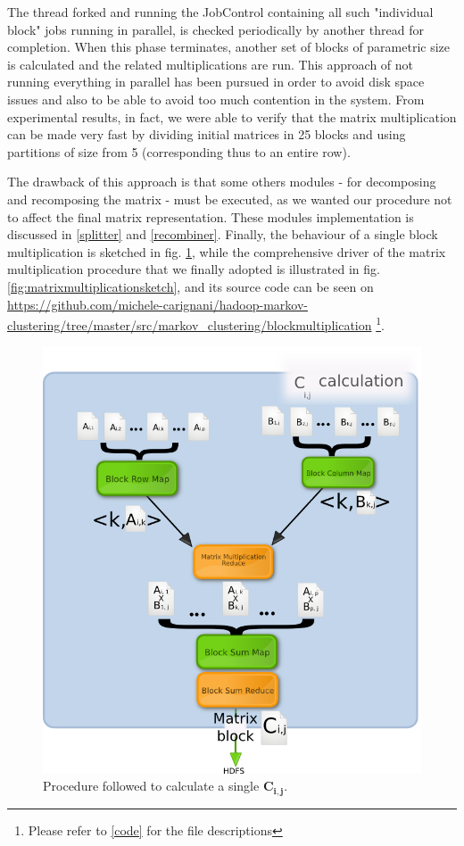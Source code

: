The thread forked and running the JobControl containing all such "individual block" jobs running in parallel, is checked periodically by another thread for completion. When this phase terminates, another set of blocks of parametric size
is calculated and the related multiplications are run.
This approach of not running everything in parallel has been pursued in order to avoid disk space issues and also to be 
able to avoid too much contention in the system.
From experimental results, in fact, we were able to verify that the matrix multiplication can be made very fast by dividing
initial matrices in 25 blocks and using partitions of size from 5 (corresponding thus to an entire row).

The drawback of this approach is that some others modules - for decomposing and recomposing the matrix - must be executed, as we wanted our procedure not to affect the final matrix representation.
These modules implementation is discussed in \ref{splitter} and \ref{recombiner}.
Finally, the behaviour of a single block multiplication is sketched in fig. \ref{fig:blockmultiplicationsketch}, while
the comprehensive driver of the matrix multiplication procedure that we finally adopted is illustrated in fig. \ref{fig:matrixmultiplicationsketch}, and its source code can be seen on \href{https://github.com/michele-carignani/hadoop-markov-clustering/tree/master/src/markov\_clustering/blockmultiplication}{https://github.com/michele-carignani/hadoop-markov-clustering/tree/master/src/markov\_clustering/blockmultiplication} \footnote{Please refer to \ref{code} for the file descriptions}.
\begin{figure}[H]
\centering
\includegraphics[scale=0.7]{blockmultiplication.png}
\caption{Procedure followed to calculate a single $\mathbf{C_{i,j}}$.}
\label{fig:blockmultiplicationsketch}
\end{figure}

